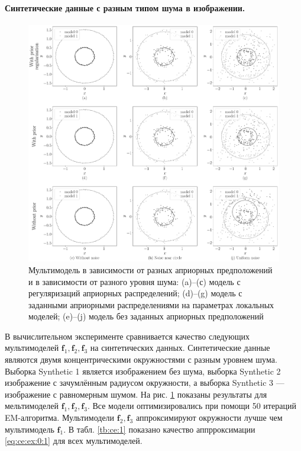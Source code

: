 \paragraph{Синтетические данные с разным типом шума в изображении.}
\begin{figure}[h!t]\center
\includegraphics[width=1\textwidth]{results/priorexpert/experiment_synthetic}
\caption{Мультимодель в зависимости от разных априорных предположений и в зависимости от разного уровня шума: (a)--(с) модель с регуляризаций априорных распределений; (d)--(g) модель с заданными априорными распределениями на параметрах локальных моделей; (e)--(j) модель без заданных априорных предположений}
\label{experiment:1}
\end{figure}
В вычислительном эксперименте сравнивается качество следующих мультимоделей $\textbf{f}_1, \textbf{f}_2, \textbf{f}_3$ на синтетических данных.
Синтетические данные являются двумя концентрическими окружностями с разным уровнем шума.
Выборка Synthetic 1 является изображением без шума, выборка Synthetic 2 изображение с зачумлённым радиусом окружности, а выборка Synthetic 3 --- изображение с равномерным шумом.
На рис. \ref{experiment:1} показаны результаты для мельтимоделей $\textbf{f}_1, \textbf{f}_2, \textbf{f}_3$.
Все модели оптимизировались при помощи 50 итераций EM-алгоритма.
Мультимодели $\textbf{f}_2, \textbf{f}_3$ аппроксимируют окружности лучше чем мультимодель $\textbf{f}_1$. В табл. \ref{tb:ce:1} показано качество аппрроксимации \eqref{eq:ce:ex:0:1} для всех мультимоделей.

